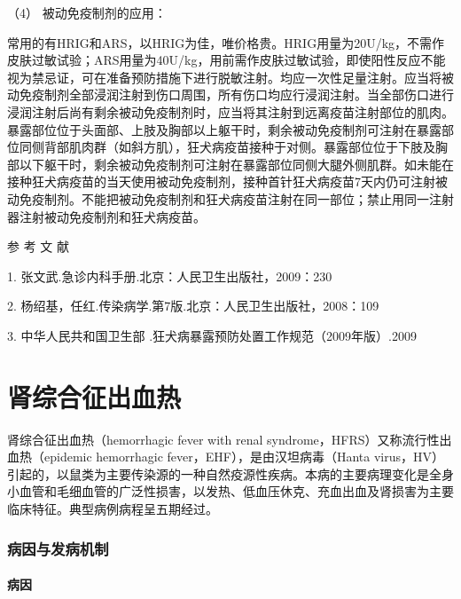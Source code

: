 \hypertarget{text00221.htmlux5cux23CHP7-6-3-2-3-4}{}
（4） 被动免疫制剂的应用：

常用的有HRIG和ARS，以HRIG为佳，唯价格贵。HRIG用量为20U/kg，不需作皮肤过敏试验；ARS用量为40U/kg，用前需作皮肤过敏试验，即使阳性反应不能视为禁忌证，可在准备预防措施下进行脱敏注射。均应一次性足量注射。应当将被动免疫制剂全部浸润注射到伤口周围，所有伤口均应行浸润注射。当全部伤口进行浸润注射后尚有剩余被动免疫制剂时，应当将其注射到远离疫苗注射部位的肌肉。暴露部位位于头面部、上肢及胸部以上躯干时，剩余被动免疫制剂可注射在暴露部位同侧背部肌肉群（如斜方肌），狂犬病疫苗接种于对侧。暴露部位位于下肢及胸部以下躯干时，剩余被动免疫制剂可注射在暴露部位同侧大腿外侧肌群。如未能在接种狂犬病疫苗的当天使用被动免疫制剂，接种首针狂犬病疫苗7天内仍可注射被动免疫制剂。不能把被动免疫制剂和狂犬病疫苗注射在同一部位；禁止用同一注射器注射被动免疫制剂和狂犬病疫苗。

\protect\hypertarget{text00222.html}{}{}

\hypertarget{text00222.htmlux5cux23CHP7-6-4}{}
参 考 文 献

1. 张文武.急诊内科手册.北京：人民卫生出版社，2009：230

2. 杨绍基，任红.传染病学.第7版.北京：人民卫生出版社，2008：109

3. 中华人民共和国卫生部 .狂犬病暴露预防处置工作规范（2009年版）.2009

\protect\hypertarget{text00223.html}{}{}

\chapter{肾综合征出血热}

肾综合征出血热（hemorrhagic fever with renal
syndrome，HFRS）又称流行性出血热（epidemic hemorrhagic
fever，EHF），是由汉坦病毒（Hanta
virus，HV）引起的，以鼠类为主要传染源的一种自然疫源性疾病。本病的主要病理变化是全身小血管和毛细血管的广泛性损害，以发热、低血压休克、充血出血及肾损害为主要临床特征。典型病例病程呈五期经过。

\subsection{病因与发病机制}

\subsubsection{病因}

